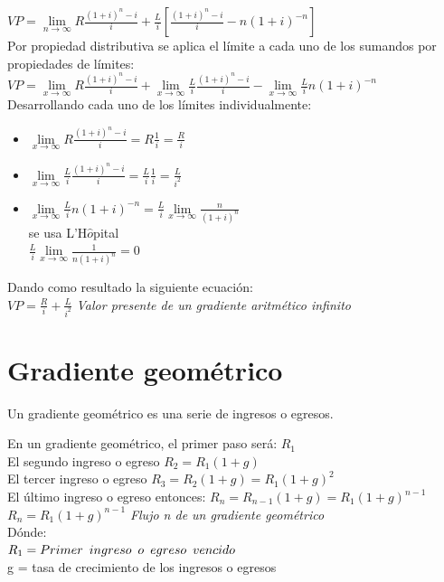 $VP = \lim\limits_{n \to \infty} R\frac{(1+i)^n-i}{i}+\frac{L}{i}[\frac{(1+i)^n-i}{i}-n(1+i)^{-n}] $\\

	Por propiedad distributiva se aplica el límite a cada uno de los sumandos por propiedades de límites:\\
	
$VP = \lim\limits_{x \to \infty} R\frac{(1+i)^n-i}{i} + \lim\limits_{x \to \infty} \frac{L}{i}\frac{(1+i)^n-i}{i} - \lim\limits_{x \to \infty} \frac{L}{i}n(1+i)^{-n}$\\

	Desarrollando cada uno de los límites individualmente:
	
	\begin{itemize}
		\item $\lim\limits_{x \to \infty} R\frac{(1+i)^n-i}{i} = R\frac{1}{i} = \frac{R}{i} $\\
		\item $\lim\limits_{x \to \infty} \frac{L}{i}\frac{(1+i)^n-i}{i} = \frac{L}{i} \frac{1}{i} = \frac{L}{i^2} $\\
		\item $\lim\limits_{x \to \infty} \frac{L}{i}n(1+i)^{-n} = \frac{L}{i} \lim\limits_{x \to \infty} \frac{n}{(1+i)^{n}} $\\
		      se usa L'H$\hat{o}$pital \\
		      $ \frac{L}{i} \lim\limits_{x \to \infty} \frac{1}{n(1+i)^{n}} = 0 $\\
	\end{itemize}
	
	Dando como resultado la siguiente ecuación:\\
	
$VP = \frac{R}{i} + \frac{L}{i^2}$ \hspace{35pt} \textit{Valor presente de un gradiente aritmético infinito}\\

		\section{Gradiente geométrico}
	Un gradiente geométrico es una serie de ingresos o egresos.
	
	En un gradiente geométrico, el primer paso será: $R_{1}$\\
	El segundo ingreso o egreso $R_{2} = R_{1}(1+g)$\\
	El tercer ingreso o egreso $R_{3} = R_{2}(1 + g) = R_{1}(1 + g)^{2}$\\
	El último ingreso o egreso entonces: $R_{n} = R_{n-1}(1+g) = R_{1}(1+g)^{n-1}$\\
$R_{n} = R_{1}(1+g)^{n-1}$ \hspace{35 pt} \textit{Flujo n de un gradiente geométrico}\\
	Dónde:\\
$R_{1} = Primer \hspace{5 pt} ingreso \hspace{5 pt} o \hspace{5 pt} egreso \hspace{5 pt} vencido$\\
g = tasa de crecimiento de los ingresos o egresos\\


